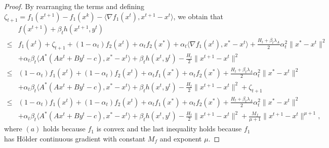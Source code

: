 \documentclass{article}
\numberwithin{equation}{section}
\begin{document}
\begin{proof}
    By rearranging the terms and defining $\zeta_{t+1} = f_1(x^{t+1})-f_1(x^k)-\langle \nabla f_1(x^t),x^{t+1}-x^t\rangle$, we obtain 
    that 
    \begin{align}
        &f(x^{t+1}) +\beta_th(x^{t+1},y^t) \nonumber \\
        \leq& f_1(x^t)+\zeta_{t+1}+(1-\alpha_t)f_2(x^t)+\alpha_tf_2(x^*)+\alpha_t\langle \nabla f_1(x^t), x^*-x^t\rangle +\frac{H_t+\beta_t\lambda_A}{2}\alpha_t^2\|x^*-x^t\rVert^2 \nonumber \\
        &+\alpha_t\beta_t\langle A^*(Ax^t+By^t-c), x^*-x^t\rangle + \beta_th(x^t,y^t) -\frac{H_t}{2}\|x^{t+1}-x^t\rVert^2 \nonumber \\
        \overset{\mathop{(a)}}{\leq} & (1-\alpha_t)f_1(x^t)+(1-\alpha_t)f_2(x^t) +\alpha_t f_1(x^*)+\alpha_tf_2(x^*)+\frac{H_t+\beta_t\lambda_A}{2}\alpha_t^2\|x^*-x^t\rVert^2 \nonumber \\
        &+\alpha_t\beta_t\langle A^*(Ax^t+By^t-c), x^*-x^t\rangle + \beta_th(x^t,y^t) -\frac{H_t}{2}\|x^{t+1}-x^t\rVert^2+\zeta_{t+1} \nonumber \\
        \leq & (1-\alpha_t)f_1(x^t)+(1-\alpha_t)f_2(x^t) +\alpha_t f_1(x^*)+\alpha_tf_2(x^*)+\frac{H_t+\beta_t\lambda_A}{2}\alpha_t^2\|x^*-x^t\rVert^2 \nonumber \\
        &+\alpha_t\beta_t\langle A^*(Ax^t+By^t-c), x^*-x^t\rangle + \beta_th(x^t,y^t) -\frac{H_t}{2}\|x^{t+1}-x^t\rVert^2 +\frac{M_f}{\mu+1}\|x^{t+1}-x^t\rVert^{\mu+1},  \label{f_beta_h}
    \end{align}
    where $(a)$ holds because $f_1$ is convex and the last inequality holds because $f_1$ has H\"older continuous gradient with constant $M_f$ and 
    exponent $\mu$. 


\end{proof}
\end{document}
